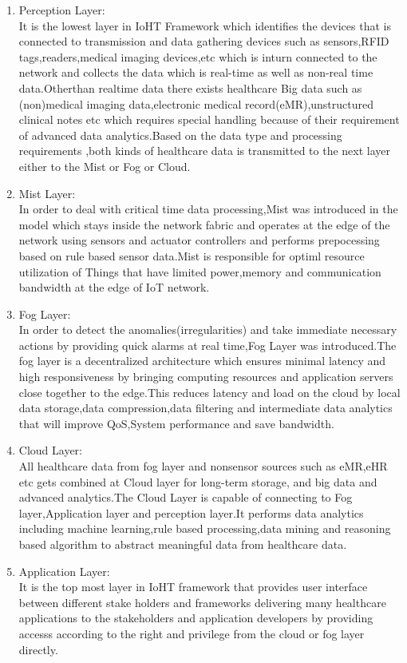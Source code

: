 \begin{enumerate}
	\item Perception Layer:\\
	It is the lowest layer in IoHT Framework which identifies the devices that is connected to transmission and data gathering devices such as sensors,RFID tags,readers,medical imaging devices,etc which is inturn connected to the network and collects the data which is real-time as well as non-real time data.Otherthan realtime data there exists healthcare Big data such as (non)medical imaging data,electronic medical record(eMR),unstructured clinical notes etc which requires special handling because of their requirement of advanced data analytics.Based on the data type and processing requirements ,both kinds of healthcare data is transmitted to the next layer either to the Mist or Fog or Cloud\cite{3}.\\
	\item Mist Layer:\\
	In order to deal with critical time data processing,Mist was introduced in the model which stays inside the network fabric and operates at the edge of the network using sensors and actuator controllers and performs prepocessing based on rule based sensor data\cite{3}.Mist is responsible for optiml resource utilization of Things that have limited power,memory and communication bandwidth at the edge of IoT network.\\
	\item Fog Layer:\\
	In order to detect the anomalies(irregularities) and take immediate necessary actions by providing quick alarms at real time,Fog Layer was introduced.The fog layer is a decentralized architecture which ensures minimal latency and high responsiveness by bringing computing resources and application servers close together to the edge\cite{3}.This reduces latency and load on the cloud by local data storage,data compression,data filtering and intermediate data analytics that will improve QoS,System performance and save bandwidth.\\
	\item Cloud Layer:\\
	All healthcare data from fog layer and nonsensor sources such as eMR,eHR etc gets combined at Cloud layer for long-term storage, and big data and advanced analytics.The Cloud Layer is capable of connecting to Fog layer,Application layer and perception layer\cite{3}.It performs data analytics including machine learning,rule based processing,data mining and reasoning based algorithm to abstract meaningful data from healthcare data.\\
	\item Application Layer:\\
	It is the top most layer in IoHT framework that provides user interface between different stake holders and frameworks delivering many healthcare applications to the stakeholders and application developers by providing accesss according to the right and privilege from the cloud or fog layer directly\cite{3}.
\end{enumerate}


